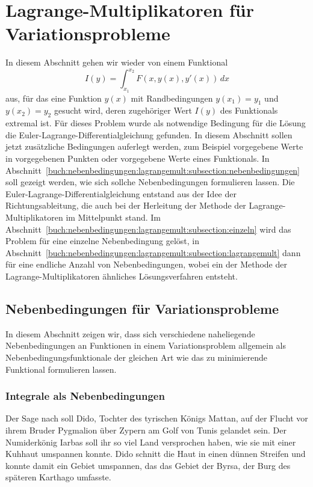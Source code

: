 %
%
%
\section{Lagrange-Multiplikatoren für Variationsprobleme
\label{buch:nebenbedingungen:section:lagrangemult}}
In diesem Abschnitt gehen wir wieder von einem Funktional
\begin{equation}
I(y)
=
\int_{x_1}^{x_2}
F(x,y(x),y'(x))
\,dx
\label{buch:nebenbedingungen:lagrangemult:eqn:}
\end{equation}
aus, für das eine Funktion $y(x)$ mit Randbedingungen $y(x_1)=y_1$ und
$y(x_2)=y_2$ gesucht wird, deren zugehöriger Wert $I(y)$ des
Funktionals extremal ist.
Für dieses Problem wurde als notwendige Bedingung für die Lösung die
Euler-Lagrange-Differentialgleichung gefunden.
In diesem Abschnitt sollen jetzt zusätzliche Bedingungen auferlegt 
werden, zum Beispiel vorgegebene Werte in vorgegebenen Punkten oder
vorgegebene Werte eines Funktionals.
In
Abschnitt~\ref{buch:nebenbedingungen:lagrangemult:subsection:nebenbedingungen}
soll gezeigt werden, wie sich sollche Nebenbedingungen formulieren
lassen.
Die Euler-Lagrange-Differentialgleichung entstand aus der Idee
der Richtungsableitung, die auch bei der Herleitung der Methode
der Lagrange-Multiplikatoren im Mittelpunkt stand.
Im
Abschnitt~\ref{buch:nebenbedingungen:lagrangemult:subsection:einzeln}
wird das Problem für eine einzelne Nebenbedingung gelöst, in
Abschnitt~\ref{buch:nebenbedingungen:lagrangemult:subsection:lagrangemult}
dann für eine endliche Anzahl von Nebenbedingungen, wobei ein der
Methode der Lagrange-Multiplikatoren ähnliches Lösungsverfahren entsteht.

%
%
\subsection{Nebenbedingungen für Variationsprobleme
\label{buch:nebenbedingungen:lagrangemult:subsection:nebenbedingungen}}
In diesem Abschnitt zeigen wir, dass sich verschiedene naheliegende
Nebenbedingungen an Funktionen in einem Variationsproblem allgemein
als Nebenbedingungsfunktionale der gleichen Art wie das zu minimierende
Funktional formulieren lassen.

%
%
\subsubsection{Integrale als Nebenbedingungen}
Der Sage nach soll Dido, Tochter des tyrischen Königs Mattan, auf der
Flucht vor ihrem Bruder Pygmalion über Zypern am Golf von Tunis 
gelandet sein.
%
%
%
%
Der Numiderkönig Iarbas soll ihr so viel Land versprochen haben, wie
sie mit einer Kuhhaut umspannen konnte.
%
Dido schnitt die Haut in einen dünnen Streifen und konnte damit ein
Gebiet umspannen, das das Gebiet der Byrsa, der Burg des späteren
Karthago umfasste.
%
%

